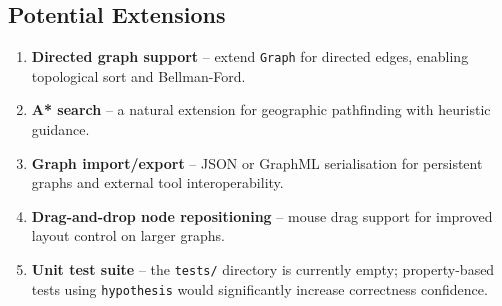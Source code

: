 \documentclass[12pt, a4paper]{article}
\begin{document}
\subsection{Potential Extensions}

\begin{enumerate}
    \item \textbf{Directed graph support} -- extend \texttt{Graph} for
          directed edges, enabling topological sort and Bellman-Ford.
    \item \textbf{A* search} -- a natural extension for geographic
          pathfinding with heuristic guidance.
    \item \textbf{Graph import/export} -- JSON or GraphML serialisation
          for persistent graphs and external tool interoperability.
    \item \textbf{Drag-and-drop node repositioning} -- mouse drag
          support for improved layout control on larger graphs.
    \item \textbf{Unit test suite} -- the \texttt{tests/} directory is
          currently empty; property-based tests using \texttt{hypothesis}
          would significantly increase correctness confidence.
\end{enumerate}
\end{document}

